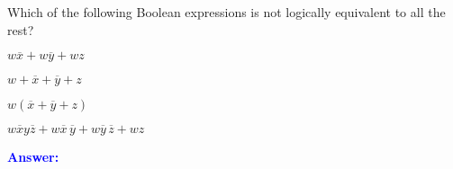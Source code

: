 \item{}
Which of the following Boolean expressions is not logically equivalent to
all the rest?
\begin{list}{\textbf{}}{}
    \item $w\overline{x}+w\overline{y}+wz$
    \item $w+\overline{x}+\overline{y}+z$
    \item $w(\overline{x}+\overline{y}+z)$
    \item $w\overline{x}y\overline{z}+w\overline{x}\,\overline{y}+w\overline{y}\,\overline{z}+wz$
\end{list}
\vskip12pt
\ifanswers
\textcolor{blue}{
\textbf{Answer:}\\
\begin{list}{\textbf{}}{}
    \item 
\end{list}
}
\newpage
\fi
